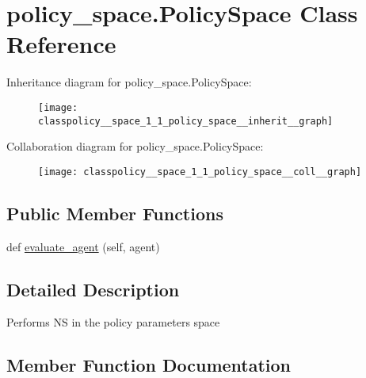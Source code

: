 \hypertarget{classpolicy__space_1_1_policy_space}{}\section{policy\+\_\+space.\+Policy\+Space Class Reference}
\label{classpolicy__space_1_1_policy_space}


Inheritance diagram for policy\+\_\+space.\+Policy\+Space\+:
\nopagebreak
\begin{figure}[H]
\begin{center}
\leavevmode
\texttt{[image: classpolicy\_\_space\_1\_1\_policy\_space\_\_inherit\_\_graph]}
\end{center}
\end{figure}


Collaboration diagram for policy\+\_\+space.\+Policy\+Space\+:
\nopagebreak
\begin{figure}[H]
\begin{center}
\leavevmode
\texttt{[image: classpolicy\_\_space\_1\_1\_policy\_space\_\_coll\_\_graph]}
\end{center}
\end{figure}
\subsection*{Public Member Functions}
\begin{DoxyCompactItemize}
\item 
def \hyperlink{classpolicy__space_1_1_policy_space_ad1bf4d4f98eb775a7b9c57d6cd2650fd}{evaluate\+\_\+agent} (self, agent)
\end{DoxyCompactItemize}


\subsection{Detailed Description}
\begin{DoxyVerb}Performs NS in the policy parameters space
\end{DoxyVerb}
 

\subsection{Member Function Documentation}
